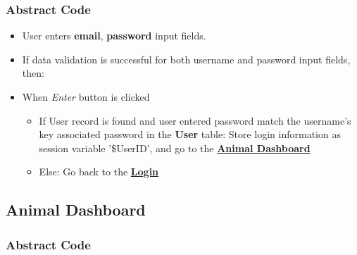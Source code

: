 \documentclass[a4paper]{article}
\begin{document}
\subsubsection*{Abstract Code}

\begin{itemize}
        \item User enters \textbf{email}, \textbf{password} input fields.
        \item If data validation is successful for both username and password input fields, then:

\item When \textit{Enter} button is clicked \begin{itemize}
        \item If User record is found and user entered password match the username's key associated password in the \textbf{User} table: Store login information as session variable '\$UserID', and go to the \underline{\textbf{Animal Dashboard}}
	\item Else: Go back to the \underline{\textbf{Login}}
	\end{itemize}
\end{itemize}

\hypertarget{animal_dashboard}{\subsection{Animal Dashboard}}

\subsubsection*{Abstract Code}
\end{document}
